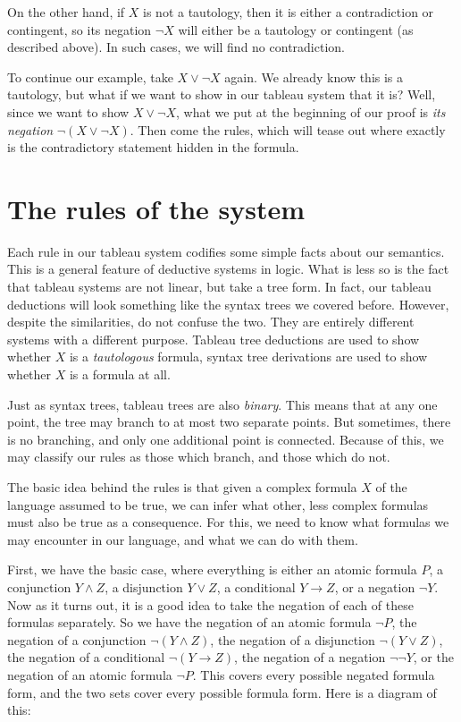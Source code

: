 On the other hand, if $X$ is not a tautology, then it is either a contradiction or contingent, so its negation $\neg X$ will either be a tautology or contingent (as described above). In such cases, we will find no contradiction. 

To continue our example, take $X \vee \neg X$ again. We already know this is a tautology, but what if we want to show in our tableau system that it is? Well, since we want to show $X \vee \neg X$, what we put at the beginning of our proof is \textit{its negation} $\neg (X \vee \neg X)$. Then come the rules, which will tease out where exactly is the contradictory statement hidden in the formula. 


\section{The rules of the system}

Each rule in our tableau system codifies some simple facts about our semantics. This is a general feature of deductive systems in logic. What is less so is the fact that tableau systems are not linear, but take a tree form. In fact, our tableau deductions will look something like the syntax trees we covered before. However, despite the similarities, do not confuse the two. They are entirely different systems with a different purpose. Tableau tree deductions are used to show whether $X$ is a \textit{tautologous} formula, syntax tree derivations are used to show whether $X$ is a formula at all.  

Just as syntax trees, tableau trees are also \textit{binary}. This means that at any one point, the tree may branch to at most two separate points. But sometimes, there is no branching, and only one additional point is connected. Because of this, we may classify our rules as those which branch, and those which do not. 

The basic idea behind the rules is that given a complex formula $X$ of the language assumed to be true, we can infer what other, less complex formulas must also be true as a consequence. For this, we need to know what formulas we may encounter in our language, and what we can do with them. 

First, we have the basic case, where everything is either an atomic formula $P$, a conjunction $Y \wedge Z$, a disjunction $Y \vee Z$, a conditional $Y \rightarrow Z$, or a negation $\neg Y$. Now as it turns out, it is a good idea to take the negation of each of these formulas separately. So we have the negation of an atomic formula $\neg P$, the negation of a conjunction $\neg (Y \wedge Z)$, the negation of a disjunction $\neg(Y \vee Z)$, the negation of a conditional $\neg (Y \rightarrow Z)$, the negation of a negation $\neg \neg Y$, or the negation of an atomic formula $\neg P$. This covers every possible negated formula form, and the two sets cover every possible formula form. Here is a diagram of this:

